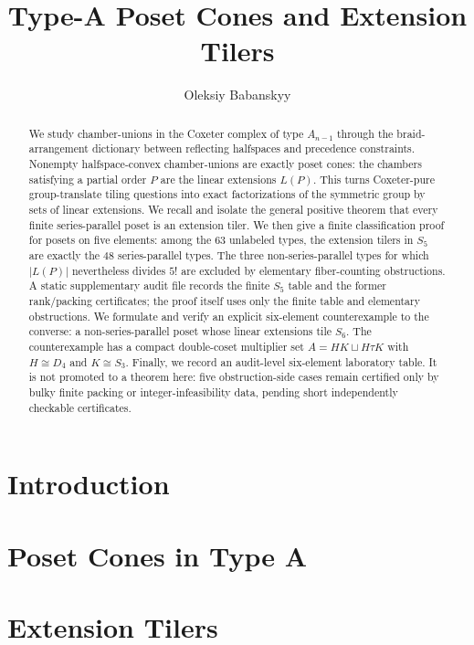 \documentclass[11pt,a4paper]{article}
\title{Type-A Poset Cones and Extension Tilers}
\author{Oleksiy Babanskyy}
\date{}
\theoremstyle{definition}
\begin{document}
\pagestyle{plain}

\maketitle

\begin{abstract}
We study chamber-unions in the Coxeter complex of type $A_{n-1}$ through
the braid-arrangement dictionary between reflecting halfspaces and
precedence constraints.  Nonempty halfspace-convex chamber-unions are
exactly poset cones: the chambers satisfying a partial order $P$ are the
linear extensions $L(P)$.  This turns Coxeter-pure group-translate tiling
questions into exact factorizations of the symmetric group by sets of
linear extensions.  We recall and isolate the general positive theorem
that every finite series-parallel poset is an extension tiler.  We then
give a finite classification proof for posets on five elements: among
the $63$ unlabeled types, the extension tilers in $S_5$ are exactly the
$48$ series-parallel types.  The three non-series-parallel types for
which $|L(P)|$ nevertheless divides $5!$ are excluded by elementary
fiber-counting obstructions.  A static supplementary audit file records the
finite $S_5$ table and the former rank/packing certificates; the proof
itself uses only the finite table and elementary obstructions.  We formulate
and verify an explicit six-element counterexample to the converse: a
non-series-parallel poset whose linear extensions tile $S_6$.  The
counterexample has a compact double-coset multiplier set
$A=HK\sqcup H\tau K$ with $H\cong D_4$ and $K\cong S_3$.  Finally, we
record an audit-level six-element laboratory table.  It is not promoted
to a theorem here: five obstruction-side cases remain certified only by
bulky finite packing or integer-infeasibility data, pending short
independently checkable certificates.
\end{abstract}

\section{Introduction}


\section{Poset Cones in Type A}


\section{Extension Tilers}

\end{document}
